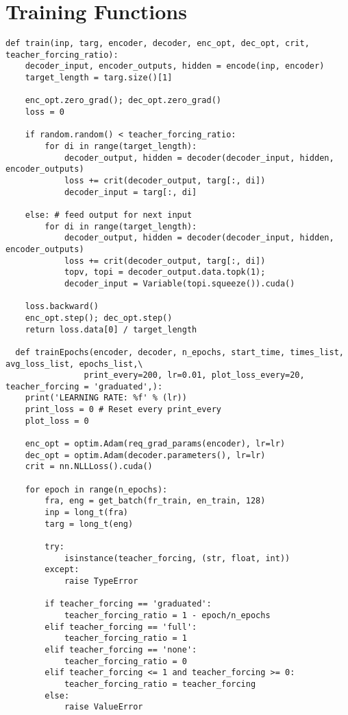 \section{Training Functions}\label{app:train}
\begin{lstlisting}
def train(inp, targ, encoder, decoder, enc_opt, dec_opt, crit, teacher_forcing_ratio):
    decoder_input, encoder_outputs, hidden = encode(inp, encoder)
    target_length = targ.size()[1]
    
    enc_opt.zero_grad(); dec_opt.zero_grad()
    loss = 0

    if random.random() < teacher_forcing_ratio:
        for di in range(target_length):
            decoder_output, hidden = decoder(decoder_input, hidden, encoder_outputs)
            loss += crit(decoder_output, targ[:, di])
            decoder_input = targ[:, di]
            
    else: # feed output for next input
        for di in range(target_length):
            decoder_output, hidden = decoder(decoder_input, hidden, encoder_outputs)
            loss += crit(decoder_output, targ[:, di])
            topv, topi = decoder_output.data.topk(1);
            decoder_input = Variable(topi.squeeze()).cuda()

    loss.backward()
    enc_opt.step(); dec_opt.step()
    return loss.data[0] / target_length

  def trainEpochs(encoder, decoder, n_epochs, start_time, times_list, avg_loss_list, epochs_list,\
                print_every=200, lr=0.01, plot_loss_every=20, teacher_forcing = 'graduated',):
    print('LEARNING RATE: %f' % (lr))
    print_loss = 0 # Reset every print_every
    plot_loss = 0
    
    enc_opt = optim.Adam(req_grad_params(encoder), lr=lr)
    dec_opt = optim.Adam(decoder.parameters(), lr=lr)
    crit = nn.NLLLoss().cuda()
    
    for epoch in range(n_epochs):
        fra, eng = get_batch(fr_train, en_train, 128)
        inp = long_t(fra)
        targ = long_t(eng)
        
        try:
            isinstance(teacher_forcing, (str, float, int))
        except:
            raise TypeError
        
        if teacher_forcing == 'graduated':
            teacher_forcing_ratio = 1 - epoch/n_epochs
        elif teacher_forcing == 'full':
            teacher_forcing_ratio = 1
        elif teacher_forcing == 'none':
            teacher_forcing_ratio = 0
        elif teacher_forcing <= 1 and teacher_forcing >= 0:
            teacher_forcing_ratio = teacher_forcing
        else:
            raise ValueError
        

\end{lstlisting}
